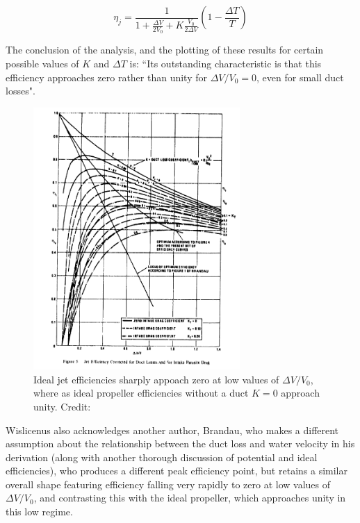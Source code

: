 \documentclass{article}\usepackage[]{graphicx}\usepackage[]{color}
\begin{document}
\begin{equation}
\label{eq:4}
\eta_j = \frac{1}{1 + \frac{\Delta V}{2V_0} + K\frac{V_0}{2 \Delta V}}(1 - \frac{\Delta T}{T})
\end{equation}


The conclusion of the analysis, and the plotting of these results for certain possible values of $K$ and $\Delta T$ is: ``Its outstanding characteristic is that this efficiency approaches zero rather than unity for $\Delta V / V_0 = 0$, even for small duct losses".

\begin{figure}
\captionsetup{width=0.6\textwidth}
\includegraphics[width=0.7\textwidth, center]{PumpjetEfficiency.png}
\caption{Ideal jet efficiencies sharply appoach zero at low values of $\Delta V / V_0$, where as ideal propeller efficiencies without a duct $K = 0$ approach unity. Credit: \cite{wislicenus1973}}
\label{fig:PumpjetEfficiency.png}
\end{figure}

Wislicenus also acknowledges \cite{wislicenus1973} another author, Brandau, who makes a different assumption about the relationship between the duct loss and water velocity \parencite{brandau1967} in his derivation (along with another thorough discussion of potential and ideal efficiencies), who produces a different peak efficiency point, but retains a similar overall shape featuring efficiency falling very rapidly to zero at low values of $\Delta V / V_0$, and contrasting this with the ideal propeller, which approaches unity in this low regime.
\end{document}
